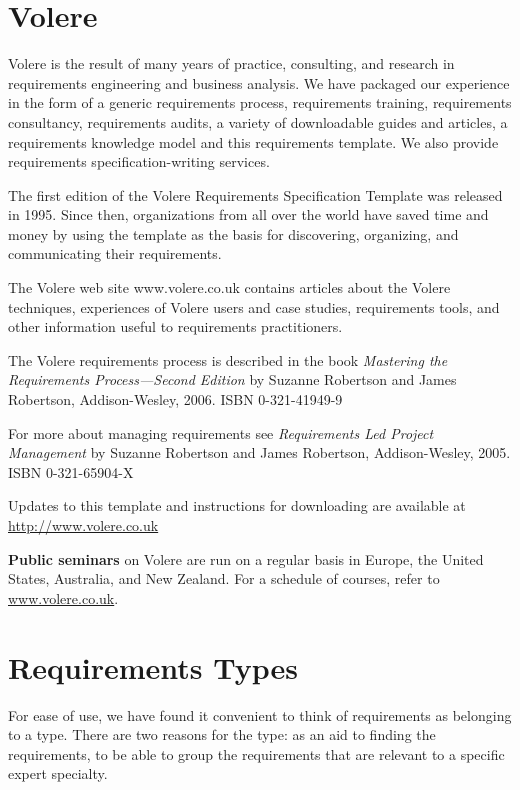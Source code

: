 \documentclass[
]{article}
\begin{document}
\hypertarget{volere-1}{%
\section{Volere}\label{volere-1}}

Volere is the result of many years of practice, consulting, and research
in requirements engineering and business analysis. We have packaged our
experience in the form of a generic requirements process, requirements
training, requirements consultancy, requirements audits, a variety of
downloadable guides and articles, a requirements knowledge model and
this requirements template. We also provide requirements
specification-writing services.

The first edition of the Volere Requirements Specification Template was
released in 1995. Since then, organizations from all over the world have
saved time and money by using the template as the basis for discovering,
organizing, and communicating their requirements.

The Volere web site www.volere.co.uk contains articles about the Volere
techniques, experiences of Volere users and case studies, requirements
tools, and other information useful to requirements practitioners.

The Volere requirements process is described in the book \emph{Mastering
the Requirements Process---Second Edition} by Suzanne Robertson and
James Robertson, Addison-Wesley, 2006. ISBN 0-321-41949-9

For more about managing requirements see \emph{Requirements Led Project
Management} by Suzanne Robertson and James Robertson, Addison-Wesley,
2005. ISBN 0-321-65904-X

Updates to this template and instructions for downloading are available
at \href{http://www.volere.co.uk/}{http://www.volere.co.uk}

\textbf{Public seminars} on Volere are run on a regular basis in Europe,
the United States, Australia, and New Zealand. For a schedule of
courses, refer to \href{http://www.volere.co.uk/}{www.volere.co.uk}.

\hypertarget{requirements-types}{%
\section{Requirements Types}\label{requirements-types}}

For ease of use, we have found it convenient to think of requirements as
belonging to a type. There are two reasons for the type: as an aid to
finding the requirements, to be able to group the requirements that are
relevant to a specific expert specialty.
\end{document}
